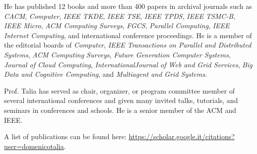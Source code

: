 He has published 12 books and more than 400 papers in archival journals such as \textit{CACM}, \hbox{\textit{Computer},} \textit{IEEE TKDE}, \textit{IEEE TSE}, \textit{IEEE TPDS}, \textit{IEEE} \textit{TSMC-B}, \textit{IEEE Micro}, \textit{ACM Computing Surveys}, \textit{FGCS}, \textit{\hbox{Parallel} \hbox{Computing}}, \textit{IEEE Internet Computing}, and international conference proceedings. He is a member of the editorial boards of \hbox{\textit{Computer},} \textit{IEEE Transactions on Parallel and Distributed Systems}, \textit{ACM Computing Surveys}, \textit{Future Generation Computer Systems}, \textit{Journal of Cloud Computing}, \textit{International\break Journal of Web and Grid Services}, \textit{Big Data and Cognitive Computing}, and \textit{Multiagent and Grid Systems}.

Prof. Talia has served as chair, organizer, or program committee member of several international conferences and given many invited talks, tutorials, and seminars in conferences and schools. He is a senior member of the ACM and IEEE.

A list of publications can be found here: \href{https://scholar.google.it/citations?user=domenicotalia}{https://{\allowbreak}scholar.{\allowbreak}google.it/{\allowbreak}citations?{\allowbreak}user={\allowbreak}domenicotalia}.



%

